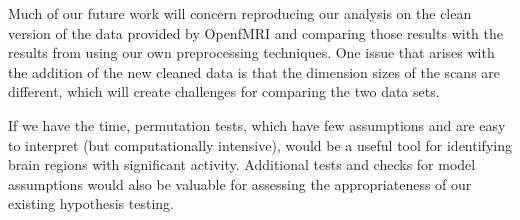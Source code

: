 \par \indent Much of our future work will concern reproducing our analysis 
on the clean version of the data provided by OpenfMRI and comparing those 
results with the results from using our own preprocessing techniques. One 
issue that arises with the addition of the new cleaned data is that the 
dimension sizes of the scans are different, which will create challenges 
for comparing the two data sets. 

\par If we have the time, permutation tests, which have few assumptions and 
are easy to interpret (but computationally intensive), would be a useful 
tool for identifying brain regions with significant activity. Additional 
tests and checks for model assumptions would also be valuable for assessing 
the appropriateness of our existing hypothesis testing. 
